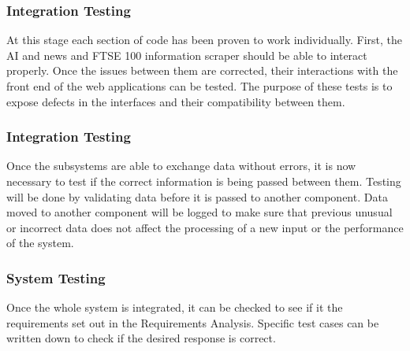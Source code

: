 \documentclass[]{IEEEtran}
\begin{document}
	\subsubsection{Integration Testing}
	At this stage each section of code has been proven to work individually. First, the AI and news and FTSE 100 information scraper should be able to interact properly. Once the issues between them are corrected, their interactions with the front end of the web applications can be tested. The purpose of these tests is to expose defects in the interfaces and their compatibility between them.
	
	\subsubsection{Integration Testing}
	Once the subsystems are able to exchange data without errors, it is now necessary to test if the correct information is being passed between them. Testing will be done by validating data before it is passed to another component. Data moved to another component will be logged to make sure that previous unusual or incorrect data does not affect the processing of a new input or the performance of the system.
	
	\subsubsection{System Testing}
	Once the whole system is integrated, it can be checked to see if it  the requirements set out in the Requirements Analysis. Specific test cases can be written down to check if the desired response is correct.
	
\end{document}
